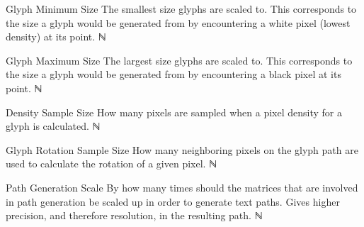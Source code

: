 \begin{itemize}
{\begin{itemize}
      \paritem
      {Glyph Minimum Size}
      {The smallest size glyphs are scaled to.
        This corresponds to the size a glyph would be generated from by encountering a white pixel (lowest density) at its point.}
      {ℕ}
      {\GlyphSzMinParSymbol}

      \paritem
      {Glyph Maximum Size}
      {The largest size glyphs are scaled to.
        This corresponds to the size a glyph would be generated from by encountering a black pixel at its point.
      }
      {ℕ}
      {\GlyphSzMaxParSymbol}

      \paritem
      {Density Sample Size}
      {How many pixels are sampled when a pixel density for a glyph is calculated.}
      {ℕ}
      {\DnsSampleParSymbol}

      \paritem
      {Glyph Rotation Sample Size}
      {How many neighboring pixels on the glyph path are used to calculate the rotation of a given pixel.}
      {ℕ}
      {\GlyphRotParSymbol}

      \paritem
      {Path Generation Scale}
      {By how many times should the matrices that are involved in path generation be scaled up in order to generate text paths.
        Gives higher precision, and therefore resolution, in the resulting path.}
      {ℕ}
      {\PathGenSclParSymbol}

    \end{itemize}
  }
\end{itemize}